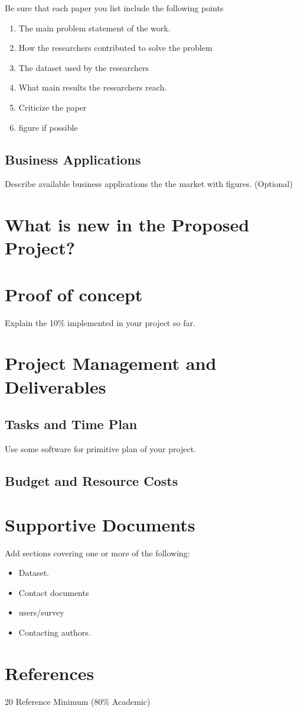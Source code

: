\documentclass[12pt]{article}
\begin{document}
Be sure that each paper you list include the following points

\begin{enumerate}
\item The main problem statement of the work.
\item How the researchers contributed to solve the problem
\item The dataset used by the researchers
\item What main results the researchers reach.
\item Criticize the paper
\item figure if possible
\end{enumerate}

\subsection{Business Applications}
Describe available business applications the the market with figures. (Optional)

\section{What is new in the Proposed Project?}

\section{Proof of concept}
Explain the 10\% implemented in your project so far.

\section{Project Management and Deliverables}
\subsection{Tasks and Time Plan}
Use some software for primitive plan of your project.
\subsection{Budget and Resource Costs}

\section{Supportive Documents}
Add sections covering one or more of the following:
\begin{itemize}

\item Dataset.
\item Contact documents
\item users/survey
\item Contacting authors.

\end{itemize}

\section {References}
20 Reference Minimum (80\% Academic)
\printbibliography
\end{document}
